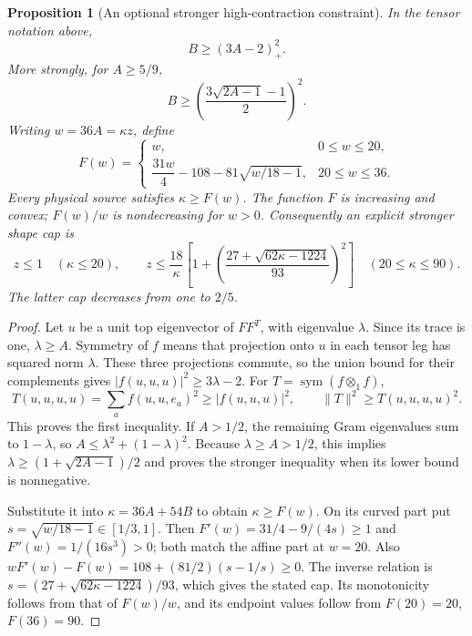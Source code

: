 \documentclass[11pt]{article}
\newtheorem{proposition}[theorem]{Proposition}
\begin{document}
\begin{proposition}[An optional stronger high-contraction constraint]
\label{prop:new-high-contraction-shape}
In the tensor notation above,
\[
 B\geq(3A-2)_+^2.
\]
More strongly, for $A\geq5/9$,
\[
 B\geq\left(\frac{3\sqrt{2A-1}-1}{2}\right)^2.
\]
Writing $w=36A=\kappa z$, define
\[
 F(w)=\begin{cases}
 w,&0\leq w\leq20,\\
 \dfrac{31w}{4}-108-81\sqrt{w/18-1},&20\leq w\leq36.
 \end{cases}
\]
Every physical source satisfies $\kappa\geq F(w)$.  The function
$F$ is increasing and convex; $F(w)/w$ is nondecreasing for $w>0$.
Consequently an explicit stronger shape cap is
\[
 z\leq1\quad(\kappa\leq20),\qquad
 z\leq\frac{18}{\kappa}
 \left[1+\left(\frac{27+\sqrt{62\kappa-1224}}{93}\right)^2\right]
                               \quad(20\leq\kappa\leq90).
\]
The latter cap decreases from one to $2/5$.
\end{proposition}
\begin{proof}
Let $u$ be a unit top eigenvector of $FF^T$, with eigenvalue
$\lambda$.  Since its trace is one, $\lambda\geq A$.
Symmetry of $f$ means that projection onto $u$ in each tensor leg
has squared norm $\lambda$.  These three projections commute, so
the union bound for their complements gives
$|f(u,u,u)|^2\geq3\lambda-2$.
For $T=\operatorname{sym}(f\otimes_1f)$,
\[
 T(u,u,u,u)=\sum_a f(u,u,e_a)^2\geq|f(u,u,u)|^2,
 \qquad \|T\|^2\geq T(u,u,u,u)^2.
\]
This proves the first inequality.  If $A>1/2$, the remaining Gram
eigenvalues sum to $1-\lambda$, so
$A\leq\lambda^2+(1-\lambda)^2$.  Because $\lambda\geq A>1/2$,
this implies $\lambda\geq(1+\sqrt{2A-1})/2$ and proves the stronger
inequality when its lower bound is nonnegative.

Substitute it into $\kappa=36A+54B$ to obtain $\kappa\geq F(w)$.
On its curved part put $s=\sqrt{w/18-1}\in[1/3,1]$.
Then $F'(w)=31/4-9/(4s)\geq1$ and $F''(w)=1/(16s^3)>0$;
both match the affine part at $w=20$.  Also
$wF'(w)-F(w)=108+(81/2)(s-1/s)\geq0$.
The inverse relation is $s=(27+\sqrt{62\kappa-1224})/93$,
which gives the stated cap.  Its monotonicity follows from that
of $F(w)/w$, and its endpoint values follow from $F(20)=20$,
$F(36)=90$.
\end{proof}
\end{document}
